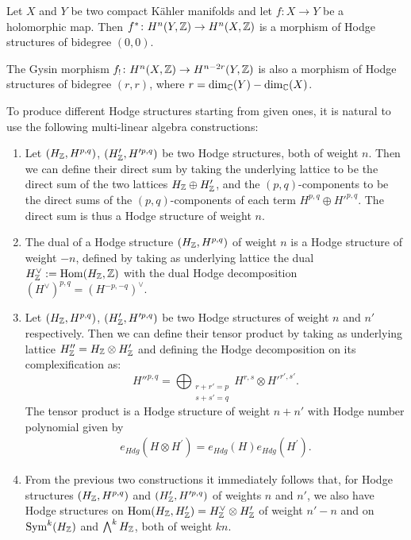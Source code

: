 \documentclass[../main.tex]{subfiles}
\begin{document}
\begin{es}
    Let $X$ and $Y$ be two compact K\"{a}hler manifolds and let $f \colon X \to Y$ be a holomorphic map. Then $f^* \colon  H^n(Y,\mathbb{Z}) \to H^n(X, \mathbb{Z})$ is a morphism of Hodge
structures of bidegree $(0, 0)$.

The Gysin morphism $f_! \colon H^n(X, \mathbb{Z}) \to H^{n-2r}(Y,\mathbb{Z})$ is also a morphism of Hodge structures of bidegree $(r, r)$, where $r = \dim_{\mathbb{C}}(Y) - \dim_{\mathbb{C}}(X)$.
\end{es}

To produce different Hodge structures starting from given ones, it is natural to use the following multi-linear algebra constructions:
\begin{enumerate}
\item Let $(H_{\mathbb{Z}},H^{p,q})$, $(H'_{\mathbb{Z}},H'^{p,q})$ be two Hodge structures, both of weight $n$. Then we can define their direct sum by taking the underlying lattice to be the direct sum of the two lattices $H_{\mathbb{Z}} \oplus H'_{\mathbb{Z}}$, and the $(p, q)$-components to be the direct sums of the $(p, q)$-components of each term $H^{p,q} \oplus H'^{p,q}$. The direct sum is thus a Hodge structure of weight $n$.
\item The dual of a Hodge structure $(H_{\mathbb{Z}},H^{p,q})$ of weight $n$ is a Hodge structure of weight $-n$, defined by taking as underlying lattice the dual $H_{\mathbb{Z}}^\vee := \operatorname{Hom} (H_{\mathbb{Z}}, \mathbb{Z})$ with the dual Hodge decomposition $(H^{\vee})^{p,q} = (H^{-p,-q})^\vee.$ 
\item Let $(H_{\mathbb{Z}},H^{p,q})$, $(H'_{\mathbb{Z}},H'^{p,q})$ be two Hodge structures of weight $n$ and $n'$ respectively. Then we can define their tensor product by taking as underlying lattice $H''_{\mathbb{Z}} = H_{\mathbb{Z}} \otimes H'_{\mathbb{Z}}$ and defining the Hodge decomposition on its complexification as:
\[
H''^{p,q} = \bigoplus_{\substack{r+r' = p\\ s+s'=q}} H^{r,s} \otimes H'^{r',s'}. 
\]
The tensor product is a Hodge structure of weight $n + n'$ with Hodge number polynomial given by
\begin{align}
    e_{Hdg}(H \otimes H^\prime) = e_{Hdg}(H)e_{Hdg}(H^\prime). \label{ProdHdgPol} 
\end{align}
\item From the previous two constructions it immediately follows that, for Hodge structures $(H_{\mathbb{Z}},H^{p,q})$ and $(H'_{\mathbb{Z}},H'^{p,q})$ of weights $n$ and $n'$, we also have Hodge structures on $\operatorname{Hom}(H_{\mathbb{Z}} , H'_{\mathbb{Z}} ) = H_{\mathbb{Z}}^\vee \otimes H'_{\mathbb{Z}}$  of weight $n'-n$ and on $\mathrm{Sym}^k (H_{\mathbb{Z}} )$ and $\bigwedge^k H_{\mathbb{Z}}$, both of weight $kn$.
\end{enumerate}
\end{document}
